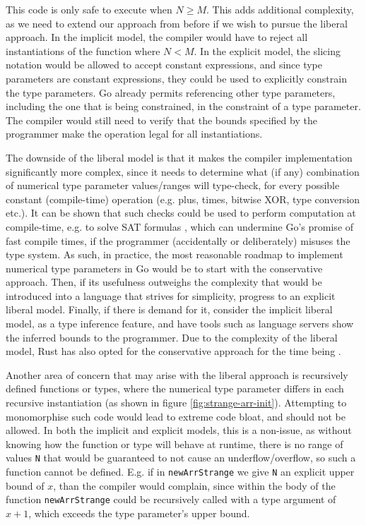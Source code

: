 
This code is only safe to execute when $N \ge M$. This adds additional
complexity, as we need to extend our approach from before if we wish to pursue
the liberal approach. In the implicit model, the compiler would have to reject
all instantiations of the function where $N < M$. In the explicit model, the
slicing notation would be allowed to accept constant expressions, and since type
parameters are constant expressions, they could be used to explicitly constrain
the type parameters. Go already permits referencing other type parameters,
including the one that is being constrained, in the constraint of a type
parameter. The compiler would still need to verify that the bounds specified by
the programmer make the operation legal for all instantiations.


The downside of the liberal model is that it makes the compiler implementation
significantly more complex, since it needs to determine what (if any)
combination of numerical type parameter values/ranges will type-check, for every
possible constant (compile-time) operation (e.g. plus, times, bitwise XOR, type
conversion etc.).
It can be shown that such checks could be used to perform computation at
compile-time, e.g. to solve SAT formulas \autocite{goArraySAT}, which can
undermine Go's promise of fast compile times, if the programmer (accidentally or
deliberately) misuses the type system. As such, in practice, the most reasonable
roadmap to implement numerical type parameters in Go would be to start with the
conservative approach. Then, if its usefulness outweighs the complexity that
would be introduced into a language that strives for simplicity, progress to an
explicit liberal model. Finally, if there is demand for it, consider the
implicit liberal model, as a type inference feature, and have tools such as
language servers show the inferred bounds to the programmer. Due to the
complexity of the liberal model, Rust has also opted for the conservative
approach for the time being \autocite{rustConstBlog}.

Another area of concern that may arise with the liberal approach is recursively
defined functions or types, where the numerical type parameter differs in each
recursive instantiation (as shown in figure \ref{fig:strange-arr-init}).
Attempting to monomorphise such code would lead to extreme code bloat, and
should not be allowed. In both the implicit and explicit models, this is a
non-issue, as without knowing how the function or type will behave at runtime,
there is no range of values \texttt{N} that would be guaranteed to not cause an
underflow/overflow, so such a function cannot be defined. E.g. if in
\texttt{newArrStrange} we give \texttt{N} an explicit upper bound of $x$, than
the compiler would complain, since within the body of the function
\texttt{newArrStrange} could be recursively called with a type argument of $x +
    1$, which exceeds the type parameter's upper bound.

